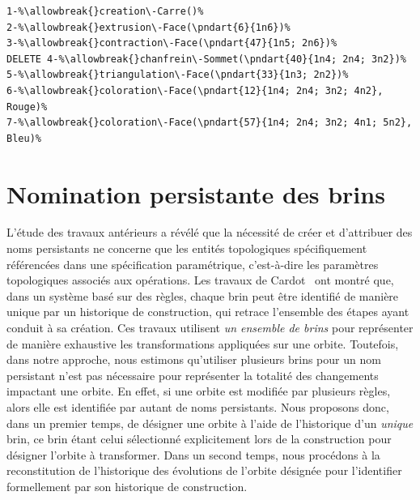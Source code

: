 \begin{lstlisting}[escapechar=\%,
style=script-style,
caption=Spécification paramétrique éditée du cas nº~2,
label=lst:reevaluation-regles-specification-parametrique-edit-cas-2,
captionpos=b]
1-%\allowbreak{}creation\-Carre()%
2-%\allowbreak{}extrusion\-Face(\pndart{6}{1n6})%
3-%\allowbreak{}contraction\-Face(\pndart{47}{1n5; 2n6})%
DELETE 4-%\allowbreak{}chanfrein\-Sommet(\pndart{40}{1n4; 2n4; 3n2})%
5-%\allowbreak{}triangulation\-Face(\pndart{33}{1n3; 2n2})%
6-%\allowbreak{}coloration\-Face(\pndart{12}{1n4; 2n4; 3n2; 4n2}, Rouge)%
7-%\allowbreak{}coloration\-Face(\pndart{57}{1n4; 2n4; 3n2; 4n1; 5n2}, Bleu)%
\end{lstlisting}



\section{Nomination persistante des brins}
\label{sec:reevaluation-nomination-persistante-brins}



L'étude des travaux antérieurs a révélé que la nécessité de créer et d'attribuer des noms persistants ne concerne que les entités topologiques spécifiquement référencées dans une spécification paramétrique, c'est-à-dire les paramètres topologiques associés aux opérations. %
Les travaux de Cardot~\cite{cardot2019} ont montré que, dans un système basé sur des règles, chaque brin peut être identifié de manière unique par un historique de construction, qui retrace l'ensemble des étapes ayant conduit à sa création. %
Ces travaux utilisent \textit{un ensemble de brins} pour
représenter de manière exhaustive les transformations appliquées sur une
orbite. %
Toutefois, dans notre approche, nous estimons qu'utiliser plusieurs
  brins pour un nom persistant n'est pas nécessaire pour représenter la totalité
  des changements impactant une orbite. %
  En effet, si une orbite est modifiée par plusieurs règles, alors elle est
  identifiée par autant de noms persistants. %
Nous proposons donc, dans un premier temps, de désigner une orbite à l'aide de
l'historique d'un \textit{unique} brin, ce brin étant celui sélectionné explicitement
lors de la construction pour désigner l'orbite à transformer. %
Dans un second temps, nous procédons à la reconstitution de l'historique des
évolutions de l'orbite désignée pour l'identifier formellement par son
historique de construction. %

